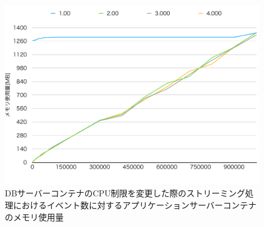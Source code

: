 \documentclass[../../../../../main]{subfiles}
\begin{document}
    \begin{figure}[H]
        \centering
        \includegraphics[width=12cm]{graph}
        \caption{DBサーバーコンテナのCPU制限を変更した際のストリーミング処理におけるイベント数に対するアプリケーションサーバーコンテナのメモリ使用量}
        \label{fig:stream-change-db-cpu-limit-app-memory-app_4_8192-db_1024}
    \end{figure}
\end{document}
